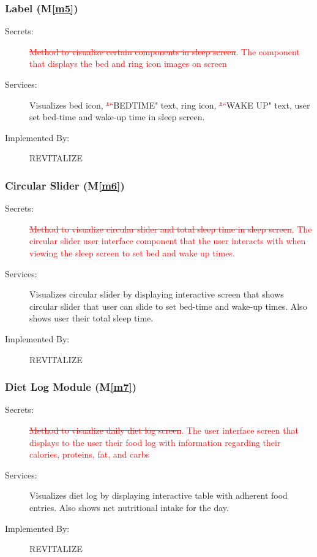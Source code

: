 \documentclass[12pt, titlepage]{article}
\newcommand{\mref}[1]{M\ref{#1}}
\begin{document}
\subsubsection{Label (\mref{m5})}
\begin{description}
	\item[Secrets:]\textcolor{red}{\sout{Method to visualize certain components in sleep screen}}\textcolor{red}{. The component that displays the bed and ring icon images on screen}
	\item[Services:]Visualizes bed icon, \textcolor{red}{\sout{"}}\textcolor{red}{``}BEDTIME" text, ring icon, \textcolor{red}{\sout{"}}\textcolor{red}{``}WAKE UP" text, user set bed-time and wake-up time in sleep screen.
	\item[Implemented By:] REVITALIZE
\end{description}

\subsubsection{Circular Slider (\mref{m6})}
\begin{description}
	\item[Secrets:]\textcolor{red}{\sout{Method to visualize circular slider and total sleep time in sleep screen}}\textcolor{red}{. The circular slider user interface component that the user interacts with when viewing the sleep screen to set bed and wake up times.}
	\item[Services:]Visualizes circular slider by displaying interactive screen that shows circular slider that user can slide to set bed-time and wake-up times. Also shows user their total sleep time.
	\item[Implemented By:] REVITALIZE
\end{description}

\subsubsection{Diet Log Module (\mref{m7})}
\begin{description}
	\item[Secrets:]\textcolor{red}{\sout{Method to visualize daily diet log screen}}\textcolor{red}{. The user interface screen that displays to the user their food log with information regarding their calories, proteins, fat, and carbs}
	\item[Services:]Visualizes diet log by displaying interactive table with adherent food entries. Also shows net nutritional intake for the day.
	\item[Implemented By:] REVITALIZE
\end{description}
\end{document}
